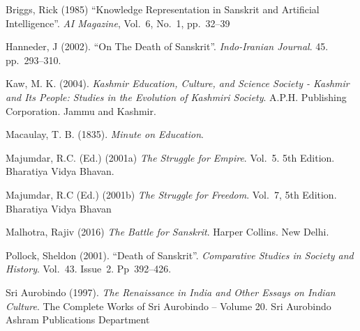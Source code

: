 \begin{thebibliography}{99}
Briggs, Rick (1985) “Knowledge Representation in Sanskrit and Artificial Intelligence”. {\sl AI Magazine}, Vol.~6, No.~1, pp.~32--39

Hanneder, J (2002). “On The Death of Sanskrit”. {\sl Indo-Iranian Journal}. 45. pp.~293--310.

Kaw, M. K. (2004). {\sl Kashmir Education, Culture, and Science Society - Kashmir and Its People: Studies in the Evolution of Kashmiri Society}. A.P.H. 
Publishing Corporation. Jammu and Kashmir.  

Macaulay, T. B. (1835). {\sl Minute on Education}.

Majumdar, R.C. (Ed.) (2001a) {\sl The Struggle for Empire}. Vol.~5. 5th Edition. Bharatiya Vidya Bhavan. 

Majumdar, R.C (Ed.) (2001b) {\sl The Struggle for Freedom}. Vol.~7, 5th Edition. Bharatiya Vidya Bhavan

Malhotra, Rajiv (2016) {\sl The Battle for Sanskrit}. Harper Collins. New Delhi.

Pollock, Sheldon (2001). “Death of Sanskrit”. {\sl Comparative Studies in Society and History}. Vol.~43. Issue~2. Pp~392--426. 

Sri Aurobindo (1997). {\sl The Renaissance in India and Other Essays on Indian Culture}. The Complete Works of Sri Aurobindo – Volume 20. Sri Aurobindo 
Ashram Publications Department

\end{thebibliography}
